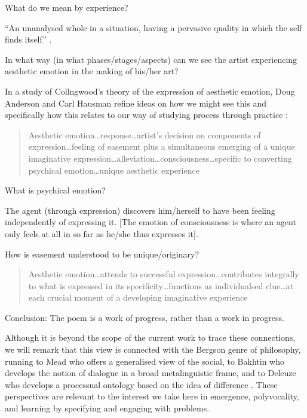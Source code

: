 What do we mean by experience?

``An unanalysed whole in a situation, having a pervasive quality in
which the self finds itself'' \cite[p. 3]{zeltner1975john}.

In what way (in what phases/stages/aspects) can we see the artist
experiencing aesthetic emotion in the making of his/her art?

In a study of Collngwood's theory of the expression of aesthetic
emotion, Doug Anderson and Carl Hausman refine ideas on how we might
see this and specifically how this relates to our way of studying
process through practice \cite[pp. 299-305]{anderson1992role}:

\begin{quote}
Aesthetic emotion\ldots  response\ldots  artist's decision on components of expression\ldots feeling of easement plus a simultaneous emerging of a unique imaginative expression\ldots alleviation\ldots consciousness\ldots specific to converting psychical emotion\ldots unique aesthetic experience 
\end{quote}

What is psychical emotion?

The agent (through expression) discovers him/herself to have been
feeling independently of expressing it. [The emotion of consciousness
  is where an agent only feels at all in so far as he/she thus
  expresses it].

How is easement understood to be unique/originary?

\begin{quote}
Aesthetic emotion\ldots attends to successful expression\ldots contributes integrally to what is expressed in its specificity\ldots functions as individualsed clue\ldots at each crucial moment of a developing imaginative experience
\end{quote}

Conclusion: The poem is a work of progress, rather than a work in
progress.

Although it is beyond the scope of the current work to trace these
connections, we will remark that this view is connected with the
Bergson genre of philosophy, running to Mead who offers a generalised
view of the social, to Bakhtin who develops the notion of dialogue in
a broad metalinguistic frame, and to Deleuze who develops a processual
ontology based on the idea of difference \cite{bergson1983creative,
  mead1932philosophy, bakhtin1984problems, deleuze1994difference}.
These perspectives are relevant to the interest we take here in
emergence, polyvocality, and learning by specifying and engaging with
problems.

